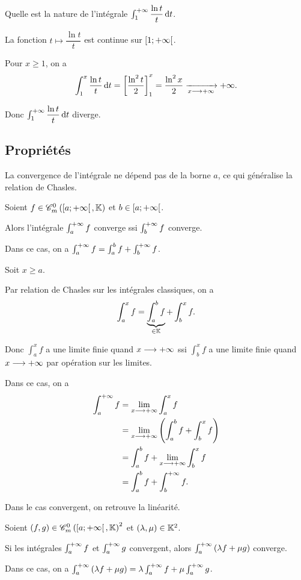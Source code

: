 \begin{exo}
Quelle est la nature de l'intégrale \(\int_1^{\pinf}\dfrac{\ln t}{t}\odif{t}\).
\end{exo}

\begin{corr}
La fonction \(t\mapsto\dfrac{\ln t}{t}\) est continue sur \(\left[1;+\infty\right[\).

Pour \(x\geq1\), on a \[\int_1^x\dfrac{\ln t}{t}\odif{t}=\croch{\dfrac{\ln^2t}{2}}_1^x=\dfrac{\ln^2x}{2}\tendqd{x\to\pinf}\pinf.\]

Donc \(\int_1^{\pinf}\dfrac{\ln t}{t}\odif{t}\) diverge.
\end{corr}

\subsection{Propriétés}

La convergence de l'intégrale ne dépend pas de la borne \(a\), ce qui généralise la relation de Chasles.

\begin{prop}
Soient \(f\in\contm[\intervie{a}{\pinf}]\) et \(b\in\left[a;+\infty\right[\).

Alors l'intégrale \(\int_a^{+\infty}f\) converge ssi \(\int_b^{+\infty}f\) converge.

Dans ce cas, on a \(\int_a^{+\infty}f=\int_a^bf+\int_b^{+\infty}f\).
\end{prop}

\begin{dem}
Soit \(x\geq a\).

Par relation de Chasles sur les intégrales classiques, on a \[\int_a^xf=\underbrace{\int_a^bf}_{\in\mathbb{K}}+\int_b^xf.\]

Donc \(\int_a^xf\) a une limite finie quand \(x\longrightarrow+\infty\) ssi \(\int_b^xf\) a une limite finie quand \(x\longrightarrow+\infty\) par opération sur les limites.

Dans ce cas, on a \[\begin{aligned}
\int_a^{+\infty}f&=\lim_{x\longrightarrow+\infty}\int_a^xf \\
&=\lim_{x\longrightarrow+\infty}\left(\int_a^bf+\int_b^xf\right) \\
&=\int_a^bf+\lim_{x\longrightarrow+\infty}\int_b^xf \\
&=\int_a^bf+\int_b^{+\infty}f.
\end{aligned}\]
\end{dem}

Dans le cas convergent, on retrouve la linéarité.

\begin{prop}
Soient \(\paren{f,g}\in\contm[\intervie{a}{\pinf}]^2\) et \(\left(\lambda,\mu\right)\in\mathbb{K}^2\).

Si les intégrales \(\int_a^{+\infty}f\) et \(\int_a^{+\infty}g\) convergent, alors \(\int_a^{+\infty}\left(\lambda f+\mu g\right)\) converge.

Dans ce cas, on a \(\int_a^{+\infty}\left(\lambda f+\mu g\right)=\lambda\int_a^{+\infty}f+\mu\int_a^{+\infty}g\).
\end{prop}

